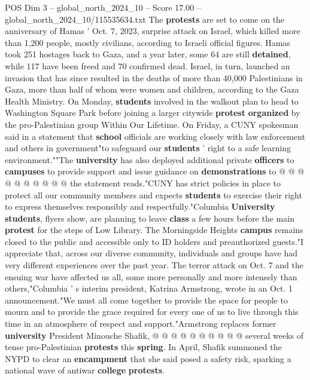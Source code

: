 \begin{textsample}{POS Dim 3 – global\_north\_2024\_10 – Score 17.00 – global\_north\_2024\_10/115535634.txt}  \label{ex:f3_pos_156}
The \textbf{protests} are set to come on the anniversary of Hamas ' Oct. 7, 2023, surprise attack on Israel, which killed more than 1,200 people, mostly civilians, according to Israeli official figures.
Hamas took 251 hostages back to Gaza, and a year later, some 64 are still \textbf{detained}, while 117 have been freed and 70 confirmed dead.
Israel, in turn, launched an invasion that has since resulted in the deaths of more than 40,000 Palestinians in Gaza, more than half of whom were women and children, according to the Gaza Health Ministry.
On Monday, \textbf{students} involved in the walkout plan to head to Washington Square Park before joining a larger citywide \textbf{protest} \textbf{organized} by the pro-Palestinian group Within Our Lifetime.
On Friday, a CUNY spokesman said in a statement that \textbf{school} officials are working closely with law enforcement and others in government"to safeguard our \textbf{students} ' right to a safe learning environment.""The \textbf{university} has also deployed additional private \textbf{officers} to \textbf{campuses} to provide support and issue guidance on \textbf{demonstrations} to @ @ @ @ @ @ @ @ @ @ the statement reads."CUNY has strict policies in place to protect all our community members and expects \textbf{students} to exercise their right to express themselves responsibly and respectfully."Columbia \textbf{University} \textbf{students}, flyers show, are planning to leave \textbf{class} a few hours before the main \textbf{protest} for the steps of Low Library.
The Morningside Heights \textbf{campus} remains closed to the public and accessible only to ID holders and preauthorized guests."I appreciate that, across our diverse community, individuals and groups have had very different experiences over the past year.
The terror attack on Oct. 7 and the ensuing war have affected us all, some more personally and more intensely than others,"Columbia ' s interim president, Katrina Armstrong, wrote in an Oct. 1 announcement."We must all come together to provide the space for people to mourn and to provide the grace required for every one of us to live through this time in an atmosphere of respect and support."Armstrong replaces former \textbf{university} President Minouche Shafik, @ @ @ @ @ @ @ @ @ @ several weeks of tense pro-Palestinian \textbf{protests} this \textbf{spring}.
In April, Shafik summoned the NYPD to clear an \textbf{encampment} that she said posed a safety risk, sparking a national wave of antiwar \textbf{college} \textbf{protests}.

\end{textsample}
